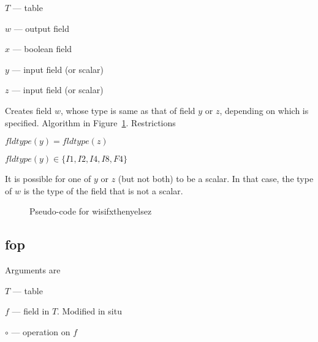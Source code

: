 \documentclass{report}
\begin{document}
\be
\item \(T\) --- table
\item \(w\) --- output field 
\item \(x\) --- boolean field 
\item \(y\) --- input field (or scalar)
\item \(z\) --- input field (or scalar)
\ee

Creates field \(w\), whose type is same as that of field \(y\) or \(z\),
depending on which is specified. 
Algorithm in Figure~\ref{pseudo_code_wisifxthenyelsez}. Restrictions
\be
\item \(fldtype(y) = fldtype(z)\)
\item \(fldtype(y) \in \{I1, I2, I4, I8, F4\}\)
\item It is possible for one of \(y\) or \(z\) (but not both) to be a scalar.
In that case, the type of \(w\) is the type of the field that is not a
scalar. 
\ee

\begin{figure}
\centering
{}
\label{pseudo_code_wisifxthenyelsez}
\caption{Pseudo-code for wisifxthenyelsez}
\end{figure}



\subsection{fop}
\label{fop}
Arguments are 
\be
\item \(T\) --- table
\item \(f\) --- field in \(T\). Modified in situ
\item \(\circ\)  --- operation on \(f\) 
\ee
\end{document}
